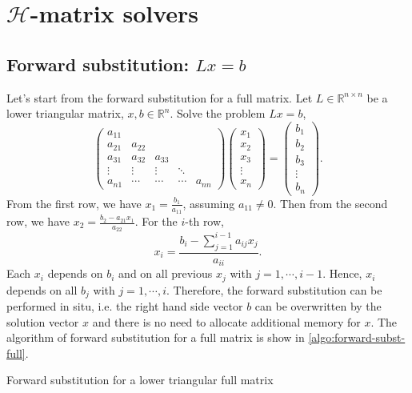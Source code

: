 \documentclass[11pt, a4paper]{book}
\begin{document}
\section{$\mathcal{H}$-matrix solvers}

\subsection{Forward substitution: $Lx=b$}
\label{sec:forward-subst}

Let's start from the forward substitution for a full matrix. Let $L\in \mathbb{R}^{n\times
  n}$ be a lower triangular matrix, $x, b\in \mathbb{R}^n$. Solve the problem $Lx=b$,
\begin{equation}
\begin{pmatrix}
  a_{11} & & & & \\
  a_{21} & a_{22} & & &\\
  a_{31} & a_{32} & a_{33} & & \\
  \vdots & \vdots & \vdots & \ddots & \\
  a_{n1} & \cdots & \cdots & \cdots & a_{nn}
\end{pmatrix}
\begin{pmatrix}
  x_1 \\ x_2 \\ x_3 \\ \vdots \\ x_n
\end{pmatrix} =
\begin{pmatrix}
  b_1 \\ b_2 \\ b_3 \\ \vdots \\ b_n
\end{pmatrix}.
\end{equation}
From the first row, we have $x_1 = \frac{b_1}{a_{11}}$, assuming $a_{11}\neq 0$. Then from
the second row, we have $x_2 = \frac{b_2 - a_{21}x_1}{a_{22}}$. For the $i$-th row,
\begin{equation}
  x_i = \frac{b_i - \sum_{j=1}^{i-1} a_{ij}x_j}{a_{ii}}.
\end{equation}
Each $x_i$ depends on $b_i$ and on all previous $x_j$ with $j=1, \cdots, i-1$. Hence,
$x_i$ depends on all $b_j$ with $j=1, \cdots, i$. Therefore, the forward substitution can
be performed in situ, i.e. the right hand side vector $b$ can be overwritten by the
solution vector $x$ and there is no need to allocate additional memory for $x$. The
algorithm of forward substitution for a full matrix is show in \ref{algo:forward-subst-full}.
\begin{breakablealgorithm}
  \label{algo:forward-subst-full}
  \caption{Forward substitution for a lower triangular full matrix}
  \begin{algorithmic}[1]
        \EndFor
      \EndFor
    \EndProcedure
  \end{algorithmic}
\end{breakablealgorithm}
\end{document}

